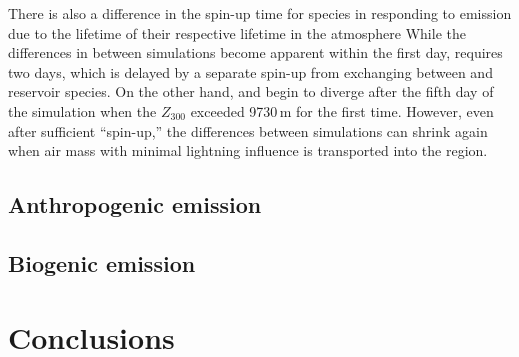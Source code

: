 There is also a difference in the spin-up time for species in responding to {\lnox} emission due to the lifetime of their respective lifetime in
the atmosphere While the differences in  between simulations become apparent within the first day,  requires 
two days, which is delayed by a separate spin-up from exchanging between  and reservoir species. On the other hand,
 and  begin to diverge after the fifth day of the simulation when the $Z_{300}$ exceeded 9730\,\unit{m} for the first
time.  However, even after sufficient ``spin-up,'' the differences between simulations can shrink again when air mass with minimal lightning
influence is transported into the region.






\subsection{Anthropogenic emission}\label{ssec:2006/sens/anthrop}
\subsection{Biogenic emission}\label{ssec:2006/sens/bio}

\section{Conclusions}\label{sec:2006/conslusion}
